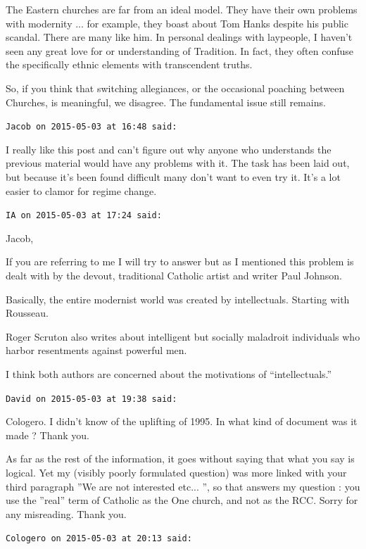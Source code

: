 \begin{footnotesize}
\begin{sffamily}
The Eastern churches are far from an ideal model. They have their own problems with modernity ... for example, they boast about Tom Hanks despite his public scandal. There are many like him. In personal dealings with laypeople, I haven't seen any great love for or understanding of Tradition. In fact, they often confuse the specifically ethnic elements with transcendent truths.

So, if you think that switching allegiances, or the occasional poaching between Churches, is meaningful, we disagree. The fundamental issue still remains.

\hfill

\texttt{Jacob on 2015-05-03 at 16:48 said:}

I really like this post and can't figure out why anyone who understands the previous material would have any problems with it. The task has been laid out, but because it's been found difficult many don't want to even try it. It's a lot easier to clamor for regime change.

\hfill

\texttt{IA on 2015-05-03 at 17:24 said:}

Jacob,

If you are referring to me I will try to answer but as I mentioned this problem is dealt with by the devout, traditional Catholic artist and writer Paul Johnson.

Basically, the entire modernist world was created by intellectuals. Starting with Rousseau.

Roger Scruton also writes about intelligent but socially maladroit individuals who harbor resentments against powerful men.

I think both authors are concerned about the motivations of ``intellectuals.''

\hfill

\texttt{David on 2015-05-03 at 19:38 said:}

Cologero. I didn't know of the uplifting of 1995. In what kind of document was it made ? Thank you.

As far as the rest of the information, it goes without saying that what you say is logical. Yet my (visibly poorly formulated question) was more linked with your third paragraph ''We are not interested etc... '', so that answers my question : you use the ''real'' term of Catholic as the One church, and not as the RCC. Sorry for any misreading. Thank you.

\hfill

\texttt{Cologero on 2015-05-03 at 20:13 said:}


\end{sffamily}
\end{footnotesize}
